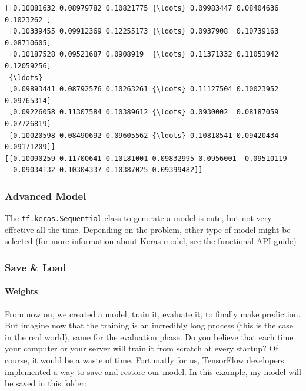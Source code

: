 \documentclass[11pt]{article}
\begin{document}
    \begin{Verbatim}[commandchars=\\\{\}]
[[0.10081632 0.08979782 0.10821775 {\ldots} 0.09983447 0.08404636 0.1023262 ]
 [0.10339455 0.09912369 0.12255173 {\ldots} 0.0937908  0.10739163 0.08710605]
 [0.10187528 0.09521687 0.0908919  {\ldots} 0.11371332 0.11051942 0.12059256]
 {\ldots}
 [0.09893441 0.08792576 0.10263261 {\ldots} 0.11127504 0.10023952 0.09765314]
 [0.09226058 0.11307584 0.10389612 {\ldots} 0.0930002  0.08187059 0.07726819]
 [0.10020598 0.08490692 0.09605562 {\ldots} 0.10818541 0.09420434 0.09171209]]
[[0.10090259 0.11700641 0.10181001 0.09832995 0.0956001  0.09510119
  0.09034132 0.10304337 0.10387025 0.09399482]]

    \end{Verbatim}

    \hypertarget{advanced-model}{%
\subsubsection{Advanced Model}\label{advanced-model}}

    The
\href{https://www.tensorflow.org/api_docs/python/tf/keras/Sequential}{\texttt{tf.keras.Sequential}}
class to generate a model is cute, but not very effective all the time.
Depending on the problem, other type of model might be selected (for
more information about Keras model, see the
\href{https://keras.io/getting-started/functional-api-guide/}{functional
API guide})

    \hypertarget{save-load}{%
\subsubsection{Save \& Load}\label{save-load}}

    \hypertarget{weights}{%
\paragraph{Weights}\label{weights}}

    From now on, we created a model, train it, evaluate it, to finally make
prediction. But imagine now that the training is an incredibly long
process (this is the case in the real world), same for the evaluation
phase. Do you believe that each time your computer or your server will
train it from scratch at every startup? Of course, it would be a waste
of time. Fortunatly for us, TensorFlow developers implemented a way to
save and restore our model. In this example, my model will be saved in
this folder:
\end{document}
